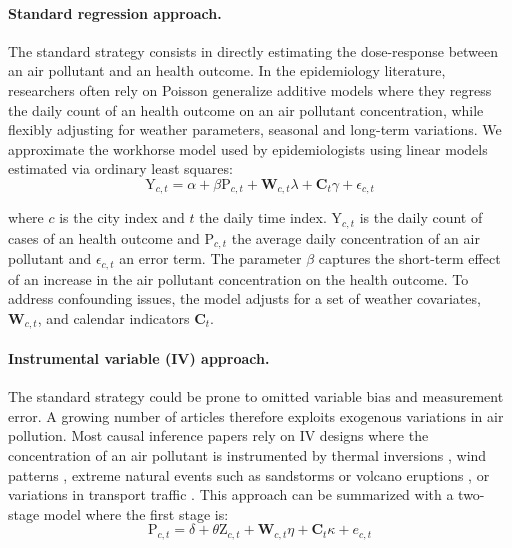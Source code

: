 \documentclass[12pt]{article}
\begin{document}
        \begin{sloppypar}
        \paragraph{Standard regression approach.} The standard strategy consists in directly estimating the dose-response between an air pollutant and an health outcome. In the epidemiology literature, researchers often rely on Poisson generalize additive models where they regress the daily count of an health outcome on an air pollutant concentration, while flexibly adjusting for weather parameters, seasonal and long-term variations. We approximate the workhorse model used by epidemiologists using linear models estimated via ordinary least squares:
        ~
        \begin{equation*}
            \text{Y}_{c,t} = \alpha + \beta\text{P}_{c,t} + \textbf{W}_{c,t}\lambda + \textbf{C}_{t}\gamma + \epsilon_{c,t}
        \end{equation*}
        \end{sloppypar}
        
        \noindent where $c$ is the city index and $t$ the daily time index. $\text{Y}_{c,t}$ is the daily count of cases of an health outcome and $\text{P}_{c,t}$ the average daily concentration of an air pollutant and $\epsilon_{c,t}$ an error term. The parameter $\beta$ captures the short-term effect of an increase in the air pollutant concentration on the health outcome. To address confounding issues, the model adjusts for a set of weather covariates,  $\textbf{W}_{c,t}$, and calendar indicators $\textbf{C}_{t}$. 
        
        \begin{sloppypar}
        \paragraph{Instrumental variable (IV) approach.} The standard strategy could be prone to omitted variable bias and measurement error. A growing number of articles therefore exploits exogenous variations in air pollution. Most causal inference papers rely on IV designs where the concentration of an air pollutant is instrumented by thermal inversions \citep{arceo_does_2016}, wind patterns \citep{schwartz_national_2018, deryugina_mortality_2019}, extreme natural events such as sandstorms or volcano eruptions \citep{ebenstein_particulate_2015, halliday_vog_2019}, or variations in transport traffic \citep{moretti_pollution_2011, knittel_caution_2016, schlenker_airports_2016}. This approach can be summarized with a two-stage model where the first stage is: 
        ~
        \begin{equation*}
        \text{P}_{c,t} = \delta + \theta\text{Z}_{c,t} + \textbf{W}_{c,t}\eta + \textbf{C}_{t}\kappa + e_{c,t}
        \end{equation*}
        \end{sloppypar}
        
\end{document}
